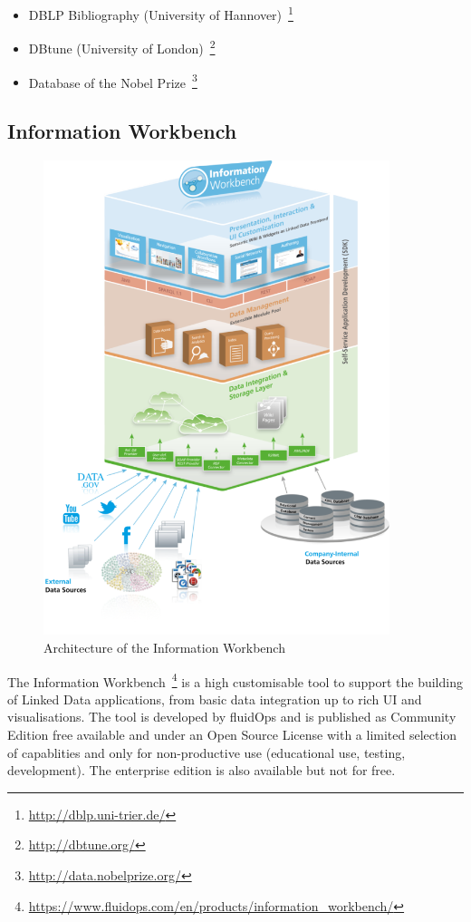\begin{itemize}
\item DBLP Bibliography (University of Hannover)~\footnote{\url{http://dblp.uni-trier.de/}}
\item DBtune (University of London)~\footnote{\url{http://dbtune.org/}}
\item Database of the Nobel Prize~\footnote{\url{http://data.nobelprize.org/}}
\end{itemize}

\subsection{Information Workbench}

\begin{figure}[htbp]
	\centering
\includegraphics[width=0.9\textwidth]{img/information_workbench_architecture.png}
	\caption{Architecture of the Information Workbench}
	\label{iw_architecture}
\end{figure}

The Information Workbench~\footnote{\url{https://www.fluidops.com/en/products/information_workbench/}} is a high customisable tool to support the building of Linked Data applications, from basic data integration up to rich UI and visualisations. The tool is developed by fluidOps and is published as Community Edition free available and under an Open Source License with a limited selection of capablities and only for non-productive use (educational use, testing, development). The enterprise edition is also available but not for free.

